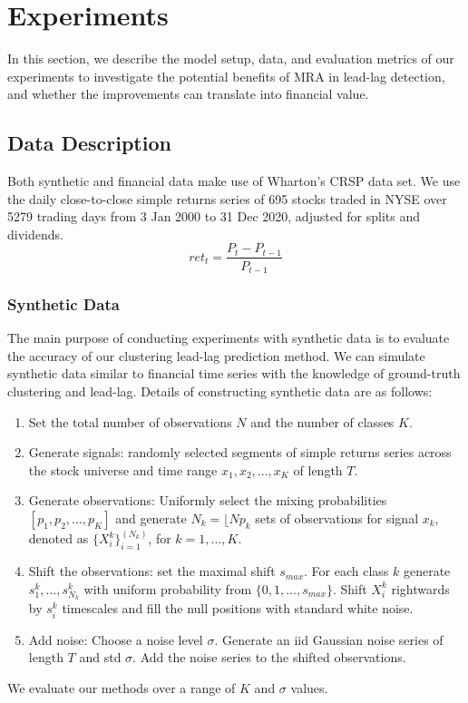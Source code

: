 \documentclass[sigconf]{acmart}
\begin{document}
\section{Experiments}
In this section, we describe the model setup, data, and evaluation metrics of our experiments to investigate the potential benefits of MRA in lead-lag detection, and whether the improvements can translate into financial value.\\


\subsection{Data Description}
Both synthetic and financial data make use of Wharton's CRSP data set. We use the daily close-to-close simple returns series of 695 stocks traded in NYSE over 5279 trading days from 3 Jan 2000 to 31 Dec 2020, adjusted for splits and dividends. 
$$ret_t = \frac{P_t-P_{t-1}}{P_{t-1}}$$

\subsubsection{Synthetic Data}
The main purpose of conducting experiments with synthetic data is to evaluate the accuracy of our clustering lead-lag prediction method. We can simulate synthetic data similar to financial time series with the knowledge of ground-truth clustering and lead-lag. 
Details of constructing synthetic data are as follows:

\begin{enumerate} 
    \item Set the total number of observations $N$ and the number of classes $K$. 
    \item Generate signals: randomly selected segments of simple returns series across the stock universe and time range $x_1,x_2,...,x_K$ of length $T$.
    \item Generate observations: Uniformly select the mixing probabilities $[p_1,p_2,...,p_K]$ and generate $N_k = \lfloor{Np_k}$ sets of observations for signal $x_k$, denoted as $\{X^k_i\}_{i=1}^(N_k)$, for $k=1,...,K$.
    \item Shift the observations: set the maximal shift $s_{max}$. For each class $k$ generate $s^k_1,...,s^k_{N_k}$ with uniform probability from $\{0,1,...,s_{max}\}$. Shift $X^k_i$ rightwards by $s^k_i$ timescales and fill the null positions with standard white noise. 
    \item Add noise: Choose a noise level $\sigma$. Generate an iid Gaussian noise series of length $T$  and std $\sigma$. Add the noise series to the shifted observations. 
\end{enumerate}
We evaluate our methods over a range of $K$ and $\sigma$ values.
\end{document}
